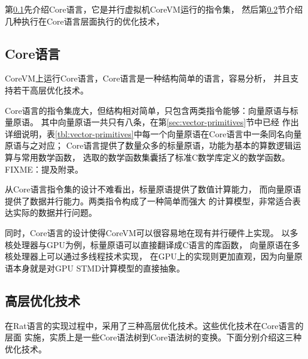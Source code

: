 第\ref{subsec:core-language}先介绍Core语言，它是并行虚拟机CoreVM运行的指令集，
然后第\ref{subsec:high-level-optimization}节介绍几种执行在Core语言层面执行的优化技术，

\subsection{Core语言}\label{subsec:core-language}
CoreVM上运行Core语言，Core语言是一种结构简单的语言，容易分析，
并且支持若干高层优化技术。

Core语言的指令集庞大，但结构相对简单，只包含两类指令能够：向量原语与标量原语。
其中向量原语一共只有八条，在第\ref{sec:vector-primitives}节中已经
作出详细说明，表\ref{tbl:vector-primitives}中每一个向量原语在Core语言中一条同名向量原语与之对应；
Core语言提供了数量众多的标量原语，功能为基本的算数逻辑运算与常用数学函数，
选取的数学函数集囊括了标准C数学库定义的数学函数。
FIXME：提及附录。

从Core语言指令集的设计不难看出，标量原语提供了数值计算能力，
而向量原语提供了数据并行能力。两类指令构成了一种简单而强大
的计算模型，非常适合表达实际的数据并行问题。

同时，Core语言的设计使得CoreVM可以很容易地在现有并行硬件上实现。
以多核处理器与GPU为例，标量原语可以直接翻译成C语言的库函数，
向量原语在多核处理器上可以通过多线程技术实现，
在GPU上的实现则更加直观，因为向量原语本身就是对GPU STMD计算模型的直接抽象。


\subsection{高层优化技术}\label{subsec:high-level-optimization}
在Rat语言的实现过程中，采用了三种高层优化技术。这些优化技术在Core语言的层面
实施，实质上是一些Core语法树到Core语法树的变换。下面分别介绍这三种优化技术。

